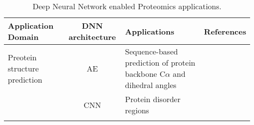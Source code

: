 \begin{table}[h!]
\centering
\begin{tabular}{|| l | c | l | l ||}
    \hline
    Application Domain & DNN architecture & Applications & References\\
    \hline \hline
    Preotein structure prediction & AE & Sequence-based prediction of protein backbone C$\alpha$ and dihedral angles & \\
    & CNN & Protein disorder regions & \\
    &   
    \hline
\end{tabular}
\caption{Deep Neural Network enabled Proteomics applications.}
\label{tab:PS-DNN}
\end{table}